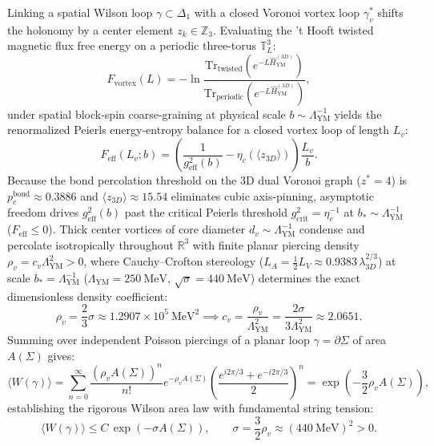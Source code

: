 \documentclass[11pt, a4paper]{article}
\theoremstyle{definition}
\theoremstyle{remark}
\begin{document}
Linking a spatial Wilson loop $\gamma \subset \Delta_{1}$ with a closed Voronoi vortex loop $\gamma_{v}^{*}$ shifts the holonomy by a center element $z_{k} \in \mathbb{Z}_{3}$. Evaluating the 't Hooft twisted magnetic flux free energy on a periodic three-torus $\mathbb{T}_{L}^{3}$:
\begin{equation}
  F_{\mathrm{vortex}}(L) = -\ln \frac{\mathrm{Tr}_{\mathrm{twisted}}\!\left(e^{-L\hat{H}_{\mathrm{YM}}^{(3D)}}\right)}{\mathrm{Tr}_{\mathrm{periodic}}\!\left(e^{-L\hat{H}_{\mathrm{YM}}^{(3D)}}\right)},
\end{equation}
under spatial block-spin coarse-graining at physical scale $b \sim \Lambda_{\mathrm{YM}}^{-1}$ yields the renormalized Peierls energy-entropy balance for a closed vortex loop of length $L_{v}$:
\begin{equation}
  F_{\mathrm{eff}}(L_{v}; b) = \left(\frac{1}{g_{\mathrm{eff}}^{2}(b)} - \eta_{c}(\langle z_{3D} \rangle)\right) \frac{L_{v}}{b}.
\end{equation}
Because the bond percolation threshold on the 3D dual Voronoi graph ($z^{*} = 4$) is $p_{c}^{\mathrm{bond}} \approx 0.3886$ and $\langle z_{3D} \rangle \approx 15.54$ eliminates cubic axis-pinning, asymptotic freedom drives $g_{\mathrm{eff}}^{2}(b)$ past the critical Peierls threshold $g_{\mathrm{crit}}^{2} = \eta_{c}^{-1}$ at $b_{*} \sim \Lambda_{\mathrm{YM}}^{-1}$ ($F_{\mathrm{eff}} \le 0$). Thick center vortices of core diameter $d_{v} \sim \Lambda_{\mathrm{YM}}^{-1}$ condense and percolate isotropically throughout $\mathbb{R}^{3}$ with finite planar piercing density $\rho_{v} = c_{v}\Lambda_{\mathrm{YM}}^{2} > 0$, where Cauchy--Crofton stereology ($L_{A} = \frac{1}{2}L_{V} \approx 0.9383\,\lambda_{3D}^{2/3}$) at scale $b_{*} = \Lambda_{\mathrm{YM}}^{-1}$ ($\Lambda_{\mathrm{YM}} = 250~\mathrm{MeV}$, $\sqrt{\sigma} = 440~\mathrm{MeV}$) determines the exact dimensionless density coefficient:
\begin{equation}
  \rho_{v} = \frac{2}{3}\sigma \approx 1.2907 \times 10^{5}~\mathrm{MeV}^{2} \implies c_{v} = \frac{\rho_{v}}{\Lambda_{\mathrm{YM}}^{2}} = \frac{2\sigma}{3\Lambda_{\mathrm{YM}}^{2}} \approx 2.0651.
\end{equation}
Summing over independent Poisson piercings of a planar loop $\gamma = \partial\Sigma$ of area $A(\Sigma)$ gives:
\begin{equation}
  \langle W(\gamma) \rangle = \sum_{n=0}^{\infty} \frac{(\rho_{v}A(\Sigma))^{n}}{n!} e^{-\rho_{v}A(\Sigma)} \left(\frac{e^{i2\pi/3} + e^{-i2\pi/3}}{2}\right)^{n} = \exp\!\left(-\frac{3}{2}\rho_{v}A(\Sigma)\right),
\end{equation}
establishing the rigorous Wilson area law with fundamental string tension:
\begin{equation}
  \langle W(\gamma) \rangle \le C\,\exp\!\left(-\sigma A(\Sigma)\right), \qquad \sigma = \frac{3}{2}\rho_{v} \approx (440~\mathrm{MeV})^{2} > 0.
\end{equation}
\end{document}
